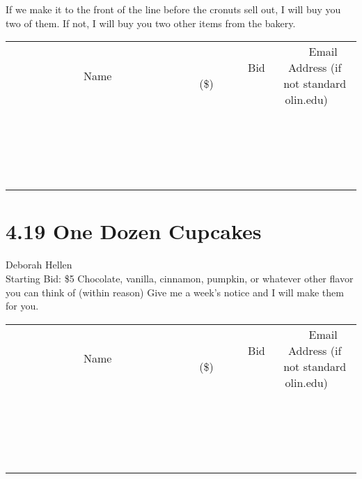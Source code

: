 \documentclass[11pt]{article}
\begin{document}
If we make it to the front of the line before the cronuts sell out, I will buy you two of them. If not, I will buy you two other items from the bakery.
\\[3ex]
\begin{tabular}{c c c}
~~~~~~~~~~~~~Name~~~~~~~~~~~~~ & ~~~~~~~~~Bid (\$)~~~~~~~~~  & ~~~Email Address (if not standard olin.edu)~~~\\
 & & \\
\hline
 & & \\
\hline
 & & \\
\hline
 & & \\
\hline
 & & \\
\hline
 & & \\
\hline
 & & \\
\hline
 & & \\
\hline
 & & \\
\hline
 & & \\
\hline
 & & \\
\hline
 & & \\
\hline
 & & \\
\hline
 & & \\
\hline
 & & \\
\hline
 & & \\
\hline
 & & \\
\hline
 & & \\
\hline
 & & \\
\hline
\end{tabular}
\newpage
\section*{4.19 One Dozen Cupcakes}
Deborah Hellen
\\
Starting Bid: \$5
\newline
Chocolate, vanilla, cinnamon, pumpkin, or whatever other flavor you can think of (within reason)
Give me a week's notice and I will make them for you.
\\[3ex]
\begin{tabular}{c c c}
~~~~~~~~~~~~~Name~~~~~~~~~~~~~ & ~~~~~~~~~Bid (\$)~~~~~~~~~  & ~~~Email Address (if not standard olin.edu)~~~\\
 & & \\
\hline
 & & \\
\hline
 & & \\
\hline
 & & \\
\hline
 & & \\
\hline
 & & \\
\hline
 & & \\
\hline
 & & \\
\hline
 & & \\
\hline
 & & \\
\hline
 & & \\
\hline
 & & \\
\hline
 & & \\
\hline
 & & \\
\hline
 & & \\
\hline
 & & \\
\hline
 & & \\
\hline
 & & \\
\hline
 & & \\
\hline
\end{tabular}
\newpage
\end{document}

